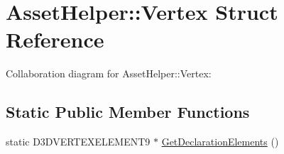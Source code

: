 \hypertarget{struct_asset_helper_1_1_vertex}{\section{Asset\+Helper\+:\+:Vertex Struct Reference}
\label{struct_asset_helper_1_1_vertex}
}


Collaboration diagram for Asset\+Helper\+:\+:Vertex\+:
\subsection*{Static Public Member Functions}
\begin{DoxyCompactItemize}
\item 
static D3\+D\+V\+E\+R\+T\+E\+X\+E\+L\+E\+M\+E\+N\+T9 $\ast$ \hyperlink{struct_asset_helper_1_1_vertex_a587eb7da05004e512d69957ed9b46cac}{Get\+Declaration\+Elements} ()
\end{DoxyCompactItemize}
